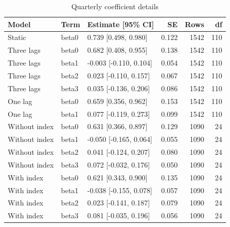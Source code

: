 \begin{table}[htbp]\centering\setlength{\tabcolsep}{4pt}\small
\caption{Quarterly coefficient details}\label{tab:si_dynamic_coefficients}
\begin{tabular}{@{}lllrrr@{}}\toprule
Model & Term & Estimate [95\% CI] & SE & Rows & df\\\midrule
Static & beta0 & 0.739 [0.498, 0.980] & 0.122 & 1542 & 110\\
Three lags & beta0 & 0.682 [0.408, 0.955] & 0.138 & 1542 & 110\\
Three lags & beta1 & -0.003 [-0.110, 0.104] & 0.054 & 1542 & 110\\
Three lags & beta2 & 0.023 [-0.110, 0.157] & 0.067 & 1542 & 110\\
Three lags & beta3 & 0.035 [-0.136, 0.206] & 0.086 & 1542 & 110\\
One lag & beta0 & 0.659 [0.356, 0.962] & 0.153 & 1542 & 110\\
One lag & beta1 & 0.077 [-0.119, 0.273] & 0.099 & 1542 & 110\\
Without index & beta0 & 0.631 [0.366, 0.897] & 0.129 & 1090 & 24\\
Without index & beta1 & -0.050 [-0.165, 0.064] & 0.055 & 1090 & 24\\
Without index & beta2 & 0.041 [-0.124, 0.207] & 0.080 & 1090 & 24\\
Without index & beta3 & 0.072 [-0.032, 0.176] & 0.050 & 1090 & 24\\
With index & beta0 & 0.621 [0.343, 0.900] & 0.135 & 1090 & 24\\
With index & beta1 & -0.038 [-0.155, 0.078] & 0.057 & 1090 & 24\\
With index & beta2 & 0.023 [-0.141, 0.187] & 0.079 & 1090 & 24\\
With index & beta3 & 0.081 [-0.035, 0.196] & 0.056 & 1090 & 24\\
\bottomrule\end{tabular}
\end{table}
